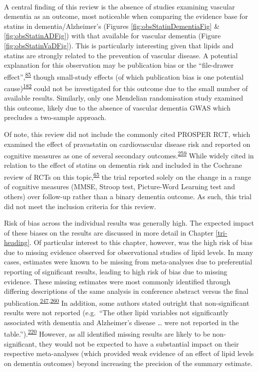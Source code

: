 \documentclass[a4paper, twoside]{templates/ociamthesis}
\begin{document}
~

A central finding of this review is the absence of studies examining vascular dementia as an outcome, most noticeable when comparing the evidence base for statins in dementia/Alzheimer's (Figures \ref{fig:obsStatinDementiaFig} \& \ref{fig:obsStatinADFig}) with that available for vascular dementia (Figure \ref{fig:obsStatinVaDFig}). This is particularly interesting given that lipids and statins are strongly related to the prevention of vascular disease. A potential explanation for this observation may be publication bias or the ``file-drawer effect'',\textsuperscript{\protect\hyperlink{ref-rosenthal1979}{85}} though small-study effects (of which publication bias is one potential cause)\textsuperscript{\protect\hyperlink{ref-sterne2011}{182}} could not be investigated for this outcome due to the small number of available results. Similarly, only one Mendelian randomisation study examined this outcome, likely due to the absence of vascular dementia GWAS which precludes a two-sample approach.

Of note, this review did not include the commonly cited PROSPER RCT, which examined the effect of pravastatin on cardiovascular disease risk and reported on cognitive measures as one of several secondary outcomes.\textsuperscript{\protect\hyperlink{ref-shepherd2002}{259}} While widely cited in relation to the effect of statins on dementia risk and included in the Cochrane review of RCTs on this topic,\textsuperscript{\protect\hyperlink{ref-mcguinness2016}{65}} the trial reported solely on the change in a range of cognitive measures (MMSE, Stroop test, Picture-Word Learning test and others) over follow-up rather than a binary dementia outcome. As such, this trial did not meet the inclusion criteria for this review.

Risk of bias across the individual results was generally high. The expected impact of these biases on the results are discussed in more detail in Chapter \ref{tri-heading}. Of particular interest to this chapter, however, was the high risk of bias due to missing evidence observed for observational studies of lipid levels. In many cases, estimates were known to be missing from meta-analyses due to preferential reporting of significant results, leading to high risk of bias due to missing evidence. These missing estimates were most commonly identified through differing descriptions of the same analysis in conference abstract versus the final publication.\textsuperscript{\protect\hyperlink{ref-yamada2009}{247},\protect\hyperlink{ref-yamada2009conf}{260}} In addition, some authors stated outright that non-significant results were not reported (e.g.~``The other lipid variables not significantly associated with dementia and Alzheimer's disease \ldots{} were not reported in the table.'').\textsuperscript{\protect\hyperlink{ref-ancelin2013}{220}} However, as all identified missing results are likely to be non-significant, they would not be expected to have a substantial impact on their respective meta-analyses (which provided weak evidence of an effect of lipid levels on dementia outcomes) beyond increasing the precision of the summary estimate.
\end{document}
